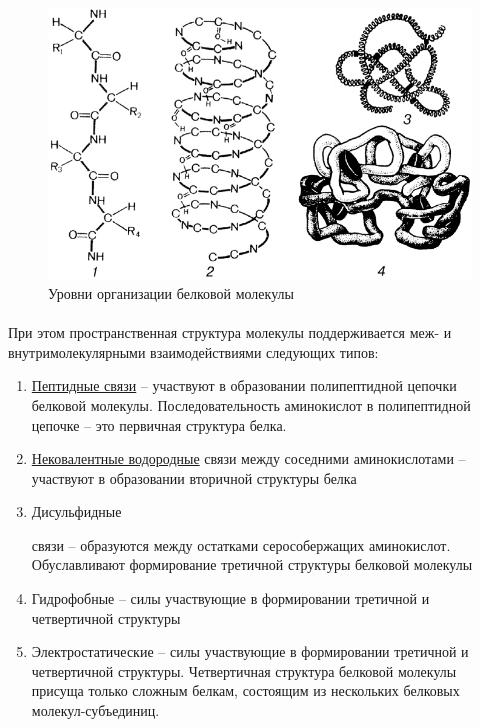 \begin{figure}[h!]
  \centering
       \includegraphics[width=0.7\linewidth]{pictures/proteins_struct}
\caption{Уровни организации белковой молекулы}

\label{proteins_struct}
\end{figure}

\paragraph*{}При этом пространственная структура молекулы поддерживается меж- и внутримолекулярными взаимодействиями следующих типов:

\begin{enumerate}

	\item \hyperlink{pept_bound}{Пептидные связи} -- участвуют в образовании полипептидной цепочки белковой молекулы. Последовательность аминокислот в полипептидной цепочке -- это первичная структура белка.
	\item \hyperlink{question_chem_bounds}{Нековалентные водородные} связи между соседними аминокислотами -- участвуют в образовании вторичной структуры белка
	\item \hypertarget{bisulphum_bound}{Дисульфидные} связи -- образуются между остатками серособержащих аминокислот. Обуславливают формирование третичной структуры белковой молекулы
	\item Гидрофобные -- силы участвующие в формировании третичной и четвертичной структуры
	\item Электростатические -- силы участвующие в формировании третичной и четвертичной структуры. Четвертичная структура белковой молекулы присуща только сложным белкам, состоящим из нескольких белковых молекул-субъединиц. 

\end{enumerate}


